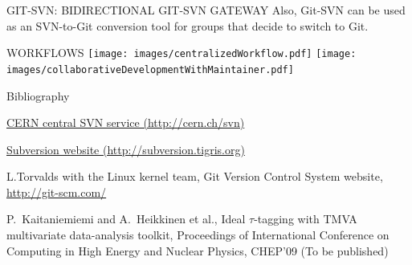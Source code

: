 \documentclass[final,hyperref={pdfpagelabels=false},notitlepage=true]{beamer}
\begin{document}
\begin{frame}{}
\begin{columns}[t]
\begin{column}{0.45\linewidth}
\begin{block}{\large GIT-SVN: BIDIRECTIONAL GIT-SVN GATEWAY}
\vspace{1cm}
          Also, Git-SVN {\color{orange} can be used as an SVN-to-Git conversion tool}
          for groups that decide to switch to Git.
	\end{block}

\vspace{2cm}
        \begin{block}{\large WORKFLOWS}
    \vskip1cm
          \texttt{[image: images/centralizedWorkflow.pdf]}
          \texttt{[image: images/collaborativeDevelopmentWithMaintainer.pdf]}
        \end{block}

    \vskip2cm
\begin{block}{\large Bibliography}
    \vskip1cm
\begin{thebibliography}{9}
\href{http://cern.ch/svn}{CERN central SVN service (http://cern.ch/svn)}

\href{http://subversion.tigris.org}{Subversion website (http://subversion.tigris.org)}

L.Torvalds with the Linux kernel team,
Git Version Control System website,
\href{http://git-scm.com/}{http://git-scm.com/}


P.~Kaitaniemiemi and A.~Heikkinen et al.,
Ideal $\tau$-tagging with TMVA multivariate data-analysis toolkit,
Proceedings of International Conference on 
Computing in High Energy and Nuclear Physics, CHEP'09
(To be published)

\end{thebibliography}
\end{block}
    \vfill
    \end{column}
    \end{columns}
  \end{frame}
\end{document}
